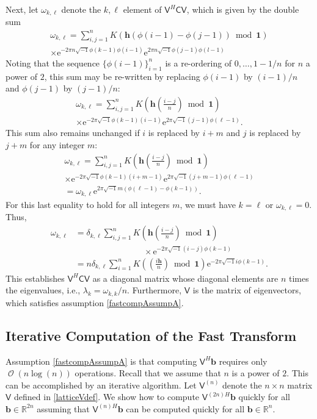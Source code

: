 \documentclass[twocolumn]{svjour3}          %
\DeclareMathOperator{\Order}{{\mathcal O}}
\newcommand{\bm}[1]{\boldsymbol{#1}}
\newcommand{\reals}{\mathbb{R}}
\newcommand{\vb}{\bm{b}}
\newcommand{\vh}{\bm{h}}
\newcommand{\vone}{\bm{1}}
\newcommand{\mC}{\mathsf{C}}
\newcommand{\mV}{\mathsf{V}}
\newcommand{\me}{\mathrm{e}}
\begin{document}
Next, let $\omega_{k, \ell}$ denote the $k,\ell$ element of $\mV^H \mC \mV$, which is given by the double sum
\begin{multline*}
\omega_{k, \ell} = \sum_{i,j=1}^n K(\vh(\phi(i-1) - \phi(j-1)) \bmod \vone ) \\
\times   \me^{-2 \pi n \sqrt{-1} \phi(k-1)\phi(i-1)}  \me^{2 \pi n \sqrt{-1} \phi(j-1)\phi(l-1)}
\end{multline*}
Noting that the sequence $\{\phi(i-1)\}_{i=1}^n$ is a re-ordering of $0, \ldots, 1-1/n$ for $n$ a power of $2$, this sum may be re-written by replacing $\phi(i-1)$ by $(i-1)/n$ and $\phi(j-1)$ by $(j-1)/n$:
\begin{multline*}
\omega_{k, \ell} = \sum_{i,j=1}^n K\left (\vh \left(\frac{i-j}{n} \right) \bmod \vone \right) \\
\times   \me^{-2 \pi \sqrt{-1} \phi(k-1)(i-1)}  \me^{2 \pi \sqrt{-1} (j-1)\phi(\ell-1)}.
\end{multline*}
This sum also remains unchanged if $i$ is replaced by $i+m$ and $j$ is replaced by $j+m$ for any integer $m$:
\begin{multline*}
\omega_{k, \ell} = \sum_{i,j=1}^n K\left (\vh \left(\frac{i-j}{n} \right) \bmod \vone \right) \\
\times   \me^{-2 \pi \sqrt{-1} \phi(k-1)(i+m-1)}  \me^{2 \pi \sqrt{-1} (j+m-1)\phi(\ell-1)} \\
=   \omega_{k, \ell}  \me^{2 \pi \sqrt{-1} m(\phi(\ell-1) - \phi(k-1))}.
\end{multline*}
For this last equality to hold for all integers $m$, we must have $k = \ell$ or $\omega_{k,\ell} = 0$.  Thus, 
\begin{align*}
\omega_{k, \ell} &= \delta_{k,\ell} \sum_{i,j=1}^n K\left (\vh \left(\frac{i-j}{n} \right) \bmod \vone \right) \\
& \qquad \qquad \qquad \qquad \times   \me^{-2 \pi \sqrt{-1} (i - j) \phi(k-1)} \\
& = n \delta_{k,\ell}  \sum_{i=1}^n K\left ( \left(\frac{i\vh}{n} \right) \bmod \vone \right)  \me^{-2 \pi \sqrt{-1} i \phi(k-1) }.
\end{align*}
This establishes $\mV^H \mC \mV$ as a diagonal matrix whose diagonal elements are $n$ times the eigenvalues, i.e., $\lambda_k = \omega_{k,k}/n$.  Furthermore, $\mV$ is the matrix of eigenvectors, which satisfies assumption \eqref{fastcompAssumpA}.

\subsection{Iterative Computation of the Fast Transform}
Assumption \eqref{fastcompAssumpA} is that computing $\mV^H \vb$ requires only $\Order(n \log(n)) $ operations.  Recall that we assume that $n$ is a power of $2$.  This can be accomplished by an iterative algorithm.  Let $\mV^{(n)}$ denote the $n \times n$ matrix $\mV$ defined in  \eqref{latticeVdef}.  We show how to compute $\mV^{(2n)H}\vb$ quickly for all $\vb \in \reals^{2n}$ assuming that $\mV^{(n)H}\vb$ can be computed quickly for all $\vb \in \reals^n$.
\end{document}
